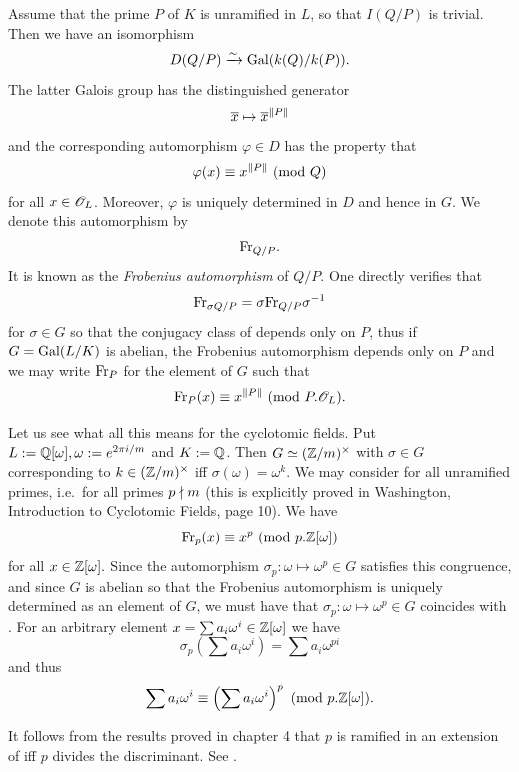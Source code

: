 \documentclass[10pt,a4paper]{amsart}
\begin{document}
\begin{defn}
Assume that the prime $P$ of $K$ is unramified in $L$, so that $I(Q/P)$ is
trivial. Then we have an isomorphism \[D(Q/P) \xrightarrow{\sim}
\mathrm{Gal}(k(Q)/k(P)).\] The latter Galois group has the distinguished generator
\[\overline{x}\mapsto \overline{x}^{\| P\|}\] and the corresponding
automorphism $\varphi\in D$ has the property that \[\varphi(x) \equiv
x^{\| P\|} \text{ } (\mathrm{mod}\text{ } Q)\] for all $x\in \mathscr{O}_L{}$. Moreover, $\varphi$ is uniquely
determined in $D$ and hence in $G$. We denote this automorphism by
\[\mathrm{Fr}_{Q/P}.\] It is known as the \textit{Frobenius automorphism} of $Q/P$. One
directly verifies that $$\mathrm{Fr}_{\sigma Q/P} = \sigma \mathrm{Fr}_{Q/P} \sigma^{-1}$$ for
$\sigma\in G$ so that the conjugacy class of  depends only on $P$, thus
if $G = \mathrm{Gal}(L/K)$ is abelian, the Frobenius automorphism depends only on $P$
and we may write \(\mathrm{Fr}_{P}\) for the element of $G$ such that \[\mathrm{Fr}_{P}(x) \equiv
x^{\| P\|} \text{ } (\mathrm{mod}\text{ } P.\mathscr{O}_L).\]
\end{defn}

\bigskip

Let us see what all this means for the cyclotomic fields. Put $L :=
\mathbb{Q}[\omega],\omega := e^{2\pi i/m}$ and $K:= \mathbb{Q}$. Then $G \simeq (\mathbb{Z}/m)^\times$
with $\sigma\in G$ corresponding to $k\in (\mathbb{Z}/m)^\times$ iff $\sigma(\omega) =
\omega^k$. We may consider  for all unramified primes, i.e.~for all
primes $p\nmid m$ (this is explicitly proved in Washington, Introduction to
Cyclotomic Fields, page 10). We have \[\mathrm{Fr}_{p}(x) \equiv x^p \text{ } (\mathrm{mod}\text{ } 
p.\mathbb{Z}[\omega])\] for all $x\in \mathbb{Z}[\omega].$ Since the automorphism $\sigma_p :
\omega \mapsto \omega^p\in G$ satisfies this congruence, and since $G$ is
abelian so that the Frobenius automorphism is uniquely determined as an element
of $G$, we must have that $\sigma_p : \omega\mapsto\omega^p \in G$ coincides
with . For an arbitrary element $x = \sum a_i \omega^i \in \mathbb{Z}[\omega]$
we have \[\sigma_p\left( \sum a_i \omega^i \right) = \sum a_i \omega^{pi}\] and
thus \[\sum a_i \omega^i \equiv \left( \sum a_i \omega^i \right)^p
\text{ } (\mathrm{mod}\text{ } p.\mathbb{Z}[\omega]).\]

\begin{rem}
It follows from the results proved in chapter 4 that $p$ is ramified in an
extension of \Q{} iff $p$ divides the discriminant. See \cite[Theorem 34,
p.~112]{M}.
\end{rem}


\end{document}

